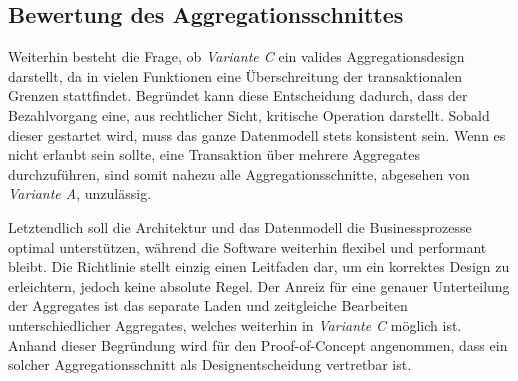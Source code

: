 \subsection{Bewertung des Aggregationsschnittes}

Weiterhin besteht die Frage, ob \emph{Variante C} ein valides Aggregationsdesign darstellt, da in vielen Funktionen eine Überschreitung der transaktionalen Grenzen stattfindet. Begründet kann diese Entscheidung dadurch, dass der Bezahlvorgang eine, aus rechtlicher Sicht, kritische Operation darstellt. Sobald dieser gestartet wird, muss das ganze Datenmodell stets konsistent sein. Wenn es nicht erlaubt sein sollte, eine Transaktion über mehrere Aggregates durchzuführen, sind somit nahezu alle Aggregationsschnitte, abgesehen von \emph{Variante A}, unzulässig. 

Letztendlich soll die Architektur und das Datenmodell die Businessprozesse optimal unterstützen, während die Software weiterhin flexibel und performant bleibt. Die Richtlinie stellt einzig einen Leitfaden dar, um ein korrektes Design zu erleichtern, jedoch keine absolute Regel. Der Anreiz für eine genauer Unterteilung der Aggregates ist das separate Laden und zeitgleiche Bearbeiten unterschiedlicher Aggregates, welches weiterhin in \emph{Variante C} möglich ist. Anhand dieser Begründung wird für den Proof-of-Concept angenommen, dass ein solcher Aggregationsschnitt als Designentscheidung vertretbar ist. 

